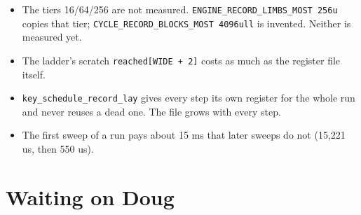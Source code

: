\begin{itemize}
\item The tiers 16/64/256 are not measured. \texttt{ENGINE\_\allowbreak{}RECORD\_\allowbreak{}LIMBS\_\allowbreak{}MOST 256u} copies that tier; \texttt{CYCLE\_\allowbreak{}RECORD\_\allowbreak{}BLOCKS\_\allowbreak{}MOST 4096ull} is invented. Neither is measured yet.
\item The ladder's scratch \texttt{reached[WIDE + 2]} costs as much as the register file itself.
\item \texttt{key\_\allowbreak{}schedule\_\allowbreak{}record\_\allowbreak{}lay} gives every step its own register for the whole run and never reuses a dead one. The file grows with every step.
\item The first sweep of a run pays about 15 ms that later sweeps do not (15,221 us, then 550 us).
\end{itemize}

\section{\texorpdfstring{Waiting on Doug}{Waiting on Doug}}

